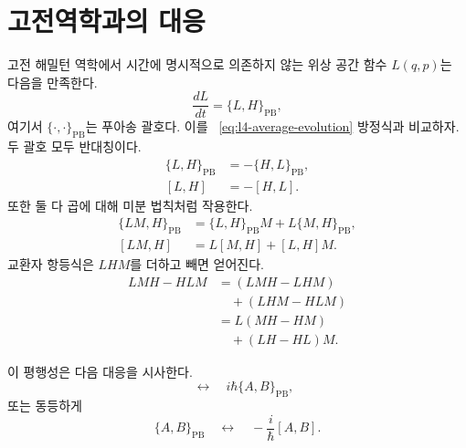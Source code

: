 \begin{classroomqa}\end{classroomqa}

\section{고전역학과의 대응}

고전 해밀턴 역학에서 시간에 명시적으로 의존하지 않는 위상 공간 함수 \(L(q,p)\)는 다음을 만족한다. \begin{equation}
\frac{dL}{dt}=\{L,H\}_{\mathrm{PB}},
\label{eq:l4-poisson-evolution}
\end{equation}여기서 \(\{\cdot,\cdot\}_{\mathrm{PB}}\)는 푸아송 괄호다. 이를 ~\eqref{eq:l4-average-evolution} 방정식과 비교하자. 두 괄호 모두 반대칭이다. \begin{align}
\{L,H\}_{\mathrm{PB}}&=-\{H,L\}_{\mathrm{PB}},\\
[L,H]&=-[H,L].
\end{align}또한 둘 다 곱에 대해 미분 법칙처럼 작용한다. \begin{align}
\{LM,H\}_{\mathrm{PB}}
&=\{L,H\}_{\mathrm{PB}}M+L\{M,H\}_{\mathrm{PB}},\\
[LM,H]
&=L[M,H]+[L,H]M.
\label{eq:l4-commutator-product}
\end{align}교환자 항등식은 \(LHM\)를 더하고 빼면 얻어진다. \begin{align}
LMH-HLM
&=(LMH-LHM)\\
&\quad +(LHM-HLM)\\
&=L(MH-HM)\\
&\quad +(LH-HL)M.
\end{align}

이 평행성은 다음 대응을 시사한다. \begin{equation}
[A,B]
\quad\longleftrightarrow\quad
i\hbar\{A,B\}_{\mathrm{PB}},
\label{eq:l4-dirac-correspondence}
\end{equation}또는 동등하게 \begin{equation}
\{A,B\}_{\mathrm{PB}}
\quad\longleftrightarrow\quad
-\frac{i}{\hbar}[A,B].
\end{equation}

